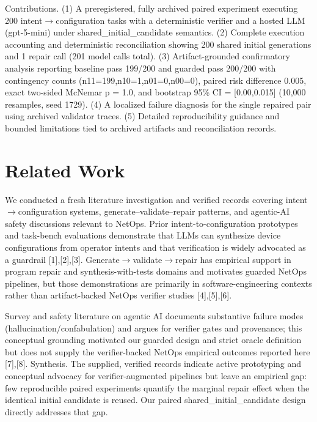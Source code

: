 \documentclass[conference]{IEEEtran}
\begin{document}
Contributions. (1) A preregistered, fully archived paired experiment executing 200 intent\ensuremath{\rightarrow}configuration tasks with a deterministic verifier and a hosted LLM (gpt-5-mini) under shared\_initial\_candidate semantics. (2) Complete execution accounting and deterministic reconciliation showing 200 shared initial generations and 1 repair call (201 model calls total). (3) Artifact-grounded confirmatory analysis reporting baseline pass 199/200 and guarded pass 200/200 with contingency counts (n11=199,n10=1,n01=0,n00=0), paired risk difference 0.005, exact two-sided McNemar p = 1.0, and bootstrap 95\% CI = [0.00,0.015] (10,000 resamples, seed 1729). (4) A localized failure diagnosis for the single repaired pair using archived validator traces. (5) Detailed reproducibility guidance and bounded limitations tied to archived artifacts and reconciliation records.

\section{Related Work}
We conducted a fresh literature investigation and verified records covering intent\ensuremath{\rightarrow}configuration systems, generate--validate--repair patterns, and agentic-AI safety discussions relevant to NetOps. Prior intent-to-configuration prototypes and task-bench evaluations demonstrate that LLMs can synthesize device configurations from operator intents and that verification is widely advocated as a guardrail [1],[2],[3]. Generate\ensuremath{\rightarrow}validate\ensuremath{\rightarrow}repair has empirical support in program repair and synthesis-with-tests domains and motivates guarded NetOps pipelines, but those demonstrations are primarily in software-engineering contexts rather than artifact-backed NetOps verifier studies [4],[5],[6].

Survey and safety literature on agentic AI documents substantive failure modes (hallucination/confabulation) and argues for verifier gates and provenance; this conceptual grounding motivated our guarded design and strict oracle definition but does not supply the verifier-backed NetOps empirical outcomes reported here [7],[8]. Synthesis. The supplied, verified records indicate active prototyping and conceptual advocacy for verifier-augmented pipelines but leave an empirical gap: few reproducible paired experiments quantify the marginal repair effect when the identical initial candidate is reused. Our paired shared\_initial\_candidate design directly addresses that gap.
\end{document}
